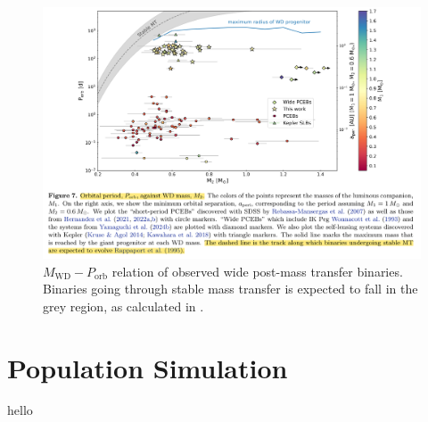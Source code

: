 \documentclass[12pt]{article}
\begin{document}
\begin{figure}
    \centering
    \includegraphics[width=\linewidth]{theory-observed.png}
    \caption{$M_{\mathrm{WD}} - P_{\mathrm{orb}}$ relation of observed wide post-mass transfer binaries. Binaries going through stable mass transfer is expected to fall in the grey region, as calculated in \cite{rappaport1995relation}.}
    \label{theory-observed}
\end{figure}

\section{Population Simulation}
hello



\end{document}
